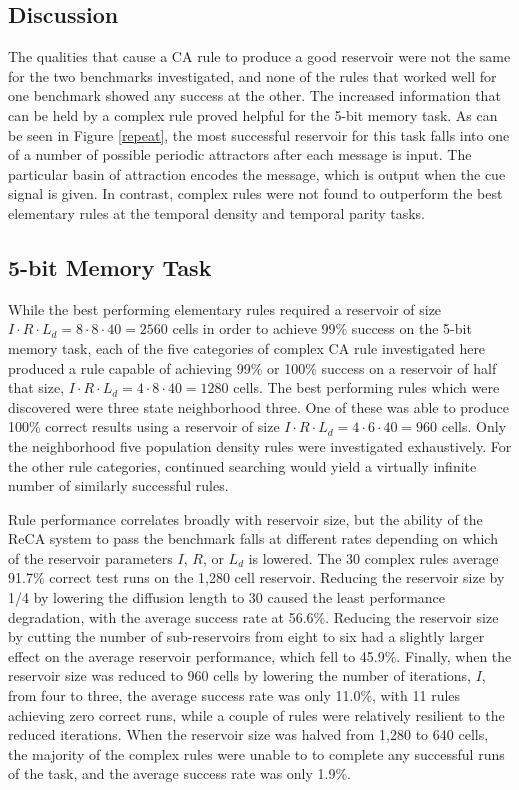 \documentclass{elsarticle}
\begin{document}
\begin{multicols}{2}
	\section{Discussion}\label{discussion}
	The qualities that cause a CA rule to produce a good reservoir were not the 
	same for the two benchmarks investigated, and none of the rules that worked 
	well for one benchmark showed any success at the other. The increased 
	information that can be held by a complex rule proved helpful for the 5-bit 
	memory task. As can be seen in Figure \ref{repeat}, the most successful 
	reservoir for this task falls into one of a number of possible  periodic 
	attractors after each message is input. The particular basin of attraction 
	encodes the message, which is output when the cue signal is given. In 
	contrast, complex rules were not found to outperform the best elementary 
	rules at the temporal density and temporal parity tasks.
	
	\subsection{5-bit Memory Task}
	While the best performing elementary rules required a reservoir of size $I \cdot R 
	\cdot L_{d} = 8 \cdot 8 \cdot 40 = 2560$ cells in order to achieve 99\% success on the 
	5-bit memory task, each of the five categories of complex CA rule investigated 
	here produced a rule capable of achieving 99\% or 100\% success on a reservoir 
	of half that size, $I \cdot R \cdot L_{d} = 4 \cdot 8 \cdot 40 = 1280$ cells. The best 
	performing rules which were discovered were three state neighborhood three. One of these 
	was able to produce 100\% correct results using a reservoir of size $I \cdot R \cdot 
	L_{d} = 4 \cdot 6 \cdot 40 = 960$ cells. Only the neighborhood five population density 
	rules were investigated exhaustively.  For the other rule categories, continued 
	searching would yield a virtually infinite number of similarly successful 
	rules. \par Rule performance correlates broadly with reservoir size, but the 
	ability of the ReCA system to  pass the benchmark falls at different rates 
	depending on which of the reservoir parameters $I$, $R$, or $L_{d}$ is lowered.  
	The 30 complex rules average 91.7\% correct test runs on the 1,280 cell 
	reservoir.  Reducing the reservoir size by 1/4 by lowering the diffusion length 
	to 30 caused the least performance degradation, with the average success rate 
	at 56.6\%. Reducing the reservoir size by cutting the number of sub-reservoirs 
	from eight to six had a slightly larger effect on the average reservoir 
	performance, which fell to 45.9\%.  Finally, when the reservoir size was 
	reduced to 960 cells by lowering the number of iterations, $I$, from four to 
	three, the average success rate was only 11.0\%, with 11 rules achieving zero 
	correct runs, while a  couple of rules were  relatively resilient to the 
	reduced iterations. When the reservoir size was halved from 1,280 to 640  
	cells, the majority of the complex rules were unable to to complete any 
	successful runs of the task, and the average success rate was only 1.9\%. \par 


\end{multicols}
\end{document}
